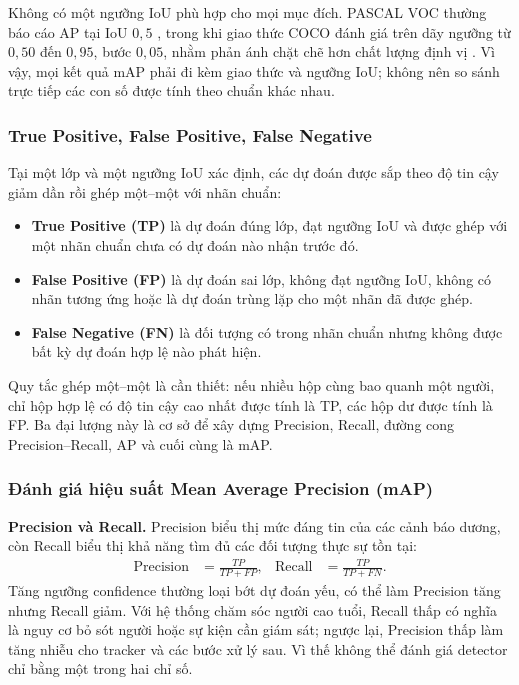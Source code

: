 Không có một ngưỡng IoU phù hợp cho mọi mục đích. PASCAL VOC thường báo cáo AP tại IoU $0{,}5$ , trong khi giao thức COCO đánh giá trên dãy ngưỡng từ $0{,}50$ đến $0{,}95$, bước $0{,}05$, nhằm phản ánh chặt chẽ hơn chất lượng định vị . Vì vậy, mọi kết quả mAP phải đi kèm giao thức và ngưỡng IoU; không nên so sánh trực tiếp các con số được tính theo chuẩn khác nhau.

\subsubsection{True Positive, False Positive, False Negative}

Tại một lớp và một ngưỡng IoU xác định, các dự đoán được sắp theo độ tin cậy giảm dần rồi ghép một--một với nhãn chuẩn:

\begin{itemize}
    \item \textbf{True Positive (TP)} là dự đoán đúng lớp, đạt ngưỡng IoU và được ghép với một nhãn chuẩn chưa có dự đoán nào nhận trước đó.
    \item \textbf{False Positive (FP)} là dự đoán sai lớp, không đạt ngưỡng IoU, không có nhãn tương ứng hoặc là dự đoán trùng lặp cho một nhãn đã được ghép.
    \item \textbf{False Negative (FN)} là đối tượng có trong nhãn chuẩn nhưng không được bất kỳ dự đoán hợp lệ nào phát hiện.
\end{itemize}

Quy tắc ghép một--một là cần thiết: nếu nhiều hộp cùng bao quanh một người, chỉ hộp hợp lệ có độ tin cậy cao nhất được tính là TP, các hộp dư được tính là FP. Ba đại lượng này là cơ sở để xây dựng Precision, Recall, đường cong Precision--Recall, AP và cuối cùng là mAP.

\subsubsection{Đánh giá hiệu suất Mean Average Precision (mAP)}

\textbf{Precision và Recall.} Precision biểu thị mức đáng tin của các cảnh báo dương, còn Recall biểu thị khả năng tìm đủ các đối tượng thực sự tồn tại:
\begin{align}
\operatorname{Precision}&=\frac{TP}{TP+FP}, &
\operatorname{Recall}&=\frac{TP}{TP+FN}.
\end{align}
Tăng ngưỡng confidence thường loại bớt dự đoán yếu, có thể làm Precision tăng nhưng Recall giảm. Với hệ thống chăm sóc người cao tuổi, Recall thấp có nghĩa là nguy cơ bỏ sót người hoặc sự kiện cần giám sát; ngược lại, Precision thấp làm tăng nhiễu cho tracker và các bước xử lý sau. Vì thế không thể đánh giá detector chỉ bằng một trong hai chỉ số.

